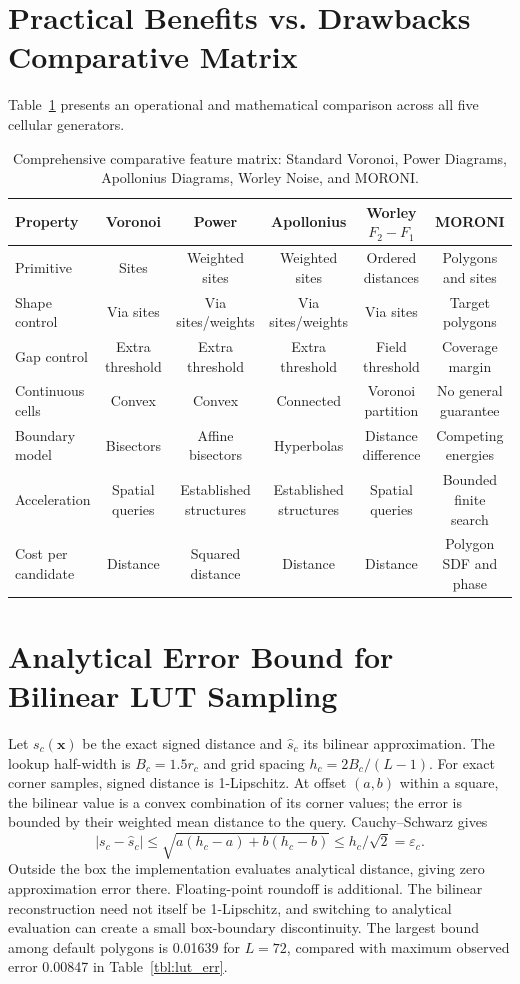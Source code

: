 \documentclass[sigconf,nonacm]{acmart}
\begin{document}
\section{Practical Benefits vs. Drawbacks Comparative Matrix}

Table~\ref{tbl:comparison_matrix} presents an operational and mathematical comparison
across all five cellular generators.

\begin{table}[t]
\centering\footnotesize
\setlength{\tabcolsep}{2.5pt}
\caption{Comprehensive comparative feature matrix: Standard Voronoi, Power
Diagrams, Apollonius Diagrams, Worley Noise, and MORONI.}
\label{tbl:comparison_matrix}
\begin{tabular}{lccccc}
\toprule
Property & Voronoi & Power & Apollonius & Worley $F_2-F_1$ & MORONI\\
\midrule
Primitive & Sites & Weighted sites & Weighted sites & Ordered distances & Polygons and sites\\
Shape control & Via sites & Via sites/weights & Via sites/weights & Via sites & Target polygons\\
Gap control & Extra threshold & Extra threshold & Extra threshold & Field threshold & Coverage margin\\
Continuous cells & Convex & Convex & Connected & Voronoi partition & No general guarantee\\
Boundary model & Bisectors & Affine bisectors & Hyperbolas & Distance difference & Competing energies\\
Acceleration & Spatial queries & Established structures & Established structures & Spatial queries & Bounded finite search\\
Cost per candidate & Distance & Squared distance & Distance & Distance & Polygon SDF and phase\\
\bottomrule
\end{tabular}
\end{table}

\section{Analytical Error Bound for Bilinear LUT Sampling}
\label{sec:appendix_lut}

Let $s_c(\mathbf{x})$ be the exact signed distance and $\hat s_c$ its bilinear approximation.
The lookup half-width is $B_c=1.5r_c$ and grid spacing $h_c=2B_c/(L-1)$.
For exact corner samples, signed distance is 1-Lipschitz. At offset $(a,b)$
within a square, the bilinear value is a convex combination of its corner
values; the error is bounded by their weighted mean distance to the query.
Cauchy--Schwarz gives
\begin{equation}
|s_c-\hat s_c|\le\sqrt{a(h_c-a)+b(h_c-b)}\le h_c/\sqrt2=\varepsilon_c.
\end{equation}
Outside the box the implementation evaluates analytical distance, giving
zero approximation error there. Floating-point roundoff is additional.
The bilinear reconstruction need not itself be 1-Lipschitz, and switching
to analytical evaluation can create a small box-boundary discontinuity.
The largest bound among default polygons is 0.01639 for $L=72$, compared
with maximum observed error 0.00847 in Table~\ref{tbl:lut_err}.
\end{document}
